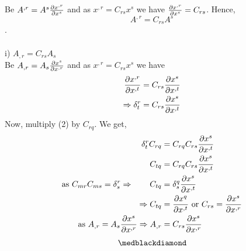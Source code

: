 Be $ A^{,r} = A^{s}\pdv{x^{,r}}{x^s}$ and as $x^{,r} = C_{rs}x^{s}$  we have $\pdv{x^{,r}}{x^s} = C_{rs}$. Hence,$$ A^{,r} = C_{rs}A^{s}$$.\\\\
 i) $ A_{,r} = C_{rs}A_{s}$\\
 Be $ A_{,r} = A_{s}\pdv{x^{s}}{x^{,r}}$ and as $x^{,r} = C_{rs}x^{s}$  we have
\begin{align}
\pdv{x^{,r}}{x^{,t}} &= C_{rs}\pdv{x^{s}}{x^{,t}}\\
\Rightarrow \delta^{r}_{t} &= C_{rs}\pdv{x^{s}}{x^{,t}}
  \end{align}
  Now, multiply (2) by $C_{rq}$. We get,
  \begin{align}
 \delta^{r}_{t}C_{rq} &= C_{rq}C_{rs}\pdv{x^{s}}{x^{,t}}\\
 \ C_{tq} &= C_{rq}C_{rs}\pdv{x^{s}}{x^{,t}}\\
 \text{as }C_{mr}C_{ms} = \delta^r_s \Rightarrow \quad \quad  C_{tq} &= \delta^q_s\pdv{x^{s}}{x^{,t}}\\
 \Rightarrow   C_{tq} &= \pdv{x^{q}}{x^{,t}} \text{  or  }  C_{rs} = \pdv{x^{s}}{x^{,r}}\\
 \text{  as  } A_{,r} = A_{s}\pdv{x^{s}}{x^{,r}} \Rightarrow A_{,r} &= C_{rs}\pdv{x^{s}}{x^{,r}}
  \end{align}
$$\medblackdiamond$$
\pagebreak[4]


